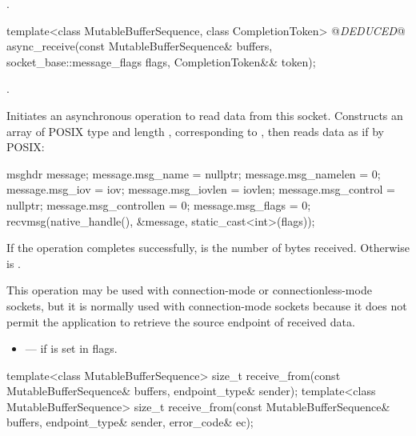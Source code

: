 \begin{itemdescr}
\pnum
\returns {}.
\end{itemdescr}

\begin{itemdecl}
template<class MutableBufferSequence, class CompletionToken>
  @\textit{DEDUCED}@ async_receive(const MutableBufferSequence& buffers,
                        socket_base::message_flags flags,
                        CompletionToken&& token);
\end{itemdecl}

\begin{itemdescr}
\pnum
\completionsig {}.

\pnum
\effects Initiates an asynchronous operation to read data from this socket. Constructs an array  of POSIX type  and length , corresponding to , then reads data as if by POSIX: 
\begin{codeblock}
msghdr message;
message.msg_name = nullptr;
message.msg_namelen = 0;
message.msg_iov = iov;
message.msg_iovlen = iovlen;
message.msg_control = nullptr;
message.msg_controllen = 0;
message.msg_flags = 0;
recvmsg(native_handle(), &message, static_cast<int>(flags));
\end{codeblock}


\pnum
If the operation completes successfully,  is the number of bytes received. Otherwise  is .

\pnum
 \enternote This operation may be used with connection-mode or connectionless-mode sockets, but it is normally used with connection-mode sockets because it does not permit the application to retrieve the source endpoint of received data. \exitnote

\pnum
\errors
\begin{itemize}
\item
{} --- if  is set in flags.
\end{itemize}
\end{itemdescr}

\begin{itemdecl}
template<class MutableBufferSequence>
  size_t receive_from(const MutableBufferSequence& buffers,
                      endpoint_type& sender);
template<class MutableBufferSequence>
  size_t receive_from(const MutableBufferSequence& buffers,
                      endpoint_type& sender, error_code& ec);
\end{itemdecl}

